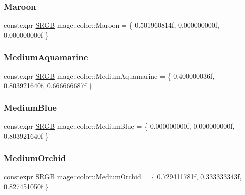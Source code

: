\hypertarget{namespacemage_1_1color_a37a269928af33b477707f7002e3ce95e}{}\label{namespacemage_1_1color_a37a269928af33b477707f7002e3ce95e} 
\subsubsection{\texorpdfstring{Maroon}{Maroon}}
{\footnotesize\ttfamily constexpr \hyperlink{structmage_1_1_s_r_g_b}{S\+R\+GB} mage\+::color\+::\+Maroon = \{ 0.\+501960814f, 0.\+000000000f, 0.\+000000000f \}}

\hypertarget{namespacemage_1_1color_a9dc83bd80ac4c1b6af103ca821f86c41}{}\label{namespacemage_1_1color_a9dc83bd80ac4c1b6af103ca821f86c41} 
\subsubsection{\texorpdfstring{Medium\+Aquamarine}{MediumAquamarine}}
{\footnotesize\ttfamily constexpr \hyperlink{structmage_1_1_s_r_g_b}{S\+R\+GB} mage\+::color\+::\+Medium\+Aquamarine = \{ 0.\+400000036f, 0.\+803921640f, 0.\+666666687f \}}

\hypertarget{namespacemage_1_1color_a293a7031c9befc9ecc78a39c2590d4c0}{}\label{namespacemage_1_1color_a293a7031c9befc9ecc78a39c2590d4c0} 
\subsubsection{\texorpdfstring{Medium\+Blue}{MediumBlue}}
{\footnotesize\ttfamily constexpr \hyperlink{structmage_1_1_s_r_g_b}{S\+R\+GB} mage\+::color\+::\+Medium\+Blue = \{ 0.\+000000000f, 0.\+000000000f, 0.\+803921640f \}}

\hypertarget{namespacemage_1_1color_abd4a0da5e534777f98b837fa8e0ada94}{}\label{namespacemage_1_1color_abd4a0da5e534777f98b837fa8e0ada94} 
\subsubsection{\texorpdfstring{Medium\+Orchid}{MediumOrchid}}
{\footnotesize\ttfamily constexpr \hyperlink{structmage_1_1_s_r_g_b}{S\+R\+GB} mage\+::color\+::\+Medium\+Orchid = \{ 0.\+729411781f, 0.\+333333343f, 0.\+827451050f \}}

